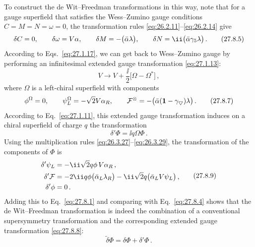 To construct the de Wit--Freedman transformations in this way, note that for
a gauge superfield that satisfies the Wess--Zumino gauge conditions
\(C=M=N=\omega=0\), the transformation rules
\eqref{eq:26.2.11}--\eqref{eq:26.2.14} give
\begin{equation}
  \delta C=0,\qquad
  \delta\omega=\sl{V}\alpha,\qquad
  \delta M=-\bigl(\bar\alpha\lambda\bigr),\qquad
  \delta N=\ii\bigl(\bar\alpha\gamma_5\lambda\bigr)\,.
  \tag{27.8.5}\label{eq:27.8.5}
\end{equation}
According to Eqs.~\eqref{eq:27.1.17}, we can get back to Wess--Zumino gauge
by performing an infinitesimal extended gauge transformation
\eqref{eq:27.1.13}:
\begin{equation}
  V\longrightarrow V+\frac{\ii}{2}\bigl[\Omega-\Omega^*\bigr]\,,
  \tag{27.8.6}\label{eq:27.8.6}
\end{equation}
where \(\Omega\) is a left-chiral superfield with components
\begin{equation}
  \phi^\Omega=0,\qquad
  \psi_L^\Omega=-\sqrt{2}\sl{V}\alpha_R,\qquad
  \mathcal{F}^\Omega
  =-\bigl(\bar\alpha(\mathbf{1}-\gamma_5)\lambda\bigr)\,.
  \tag{27.8.7}\label{eq:27.8.7}
\end{equation}
According to Eq.~\eqref{eq:27.1.11}, this extended gauge transformation
induces on a chiral superfield of charge \(q\) the transformation
\begin{equation}
  \delta'\Phi=\ii q\Omega\Phi\,.
  \tag{27.8.8}\label{eq:27.8.8}
\end{equation}
Using the multiplication rules
\eqref{eq:26.3.27}--\eqref{eq:26.3.29}, the transformation of the components
of \(\Phi\) is
\begin{equation}
  \begin{aligned}
    \delta'\psi_L
    &=-\ii\sqrt{2}q\phi\,\sl{V}\alpha_R\,,\\
    \delta'\mathcal{F}
    &=-2\ii q\phi\bigl(\bar\alpha_L\lambda_R\bigr)
      -\ii\sqrt{2}q\bigl(\bar\alpha_L\sl{V}\psi_L\bigr)\,,\\
    \delta'\phi&=0\,.
  \end{aligned}
  \tag{27.8.9}\label{eq:27.8.9}
\end{equation}
Adding this to Eq.~\eqref{eq:27.8.1} and comparing with
Eq.~\eqref{eq:27.8.4} shows that the de Wit--Freedman transformation is
indeed the combination of a conventional supersymmetry transformation and
the corresponding extended gauge transformation \eqref{eq:27.8.8}:
\begin{equation}
  \widetilde{\delta}\Phi=\delta\Phi+\delta'\Phi\,.
  \tag{27.8.10}\label{eq:27.8.10}
\end{equation}

